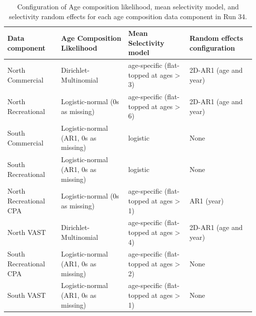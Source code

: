 \documentclass[
]{article}
\begin{document}
\begin{landscape}\begin{table}

\caption{\label{tab:age-comp-sel-table}Configuration of Age composition likelihood, mean selectivity model, and selectivity random effects for each age composition data component in Run 34.}
\centering
\begin{tabular}[t]{llll}
\toprule
Data component & Age Composition Likelihood & Mean Selectivity model & Random effects configuration\\
\midrule
North Commercial & Dirichlet-Multinomial & age-specific (flat-topped at ages > 3) & 2D-AR1 (age and year)\\
North Recreational & Logistic-normal (0s as missing) & age-specific (flat-topped at ages > 6) & 2D-AR1 (age and year)\\
South Commercial & Logistic-normal (AR1, 0s as missing) & logistic & None\\
South Recreational & Logistic-normal (AR1, 0s as missing) & logistic & None\\
North Recreational CPA & Logistic-normal (0s as missing) & age-specific (flat-topped at ages > 1) & AR1 (year)\\
\addlinespace
North VAST & Dirichlet-Multinomial & age-specific (flat-topped at ages > 4) & 2D-AR1 (age and year)\\
South Recreational CPA & Logistic-normal (AR1, 0s as missing) & age-specific (flat-topped at ages > 2) & None\\
South VAST & Logistic-normal (AR1, 0s as missing) & age-specific (flat-topped at ages > 1) & None\\
\bottomrule
\end{tabular}
\end{table}
\end{landscape}

\clearpage
\end{document}
